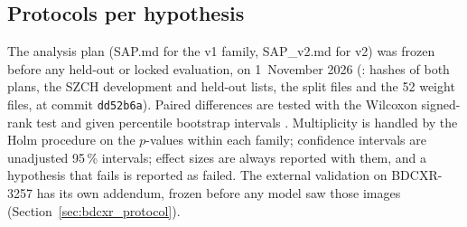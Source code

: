 \subsection{Protocols per hypothesis}
The analysis plan (SAP.md for the v1 family, SAP\_v2.md for v2) was frozen before any held-out or locked evaluation, on 1~November 2026
(: hashes of both plans, the SZCH development and held-out lists, the split files and the 52 weight files, at commit
\texttt{dd52b6a}). Paired differences are tested with the Wilcoxon signed-rank test \citep{wilcoxon1945individual} and given percentile bootstrap intervals
\citep{efron1993bootstrap}. Multiplicity is handled by the Holm procedure \citep{holm1979simple} on the $p$-values within each family; confidence intervals are unadjusted
95\,\% intervals; effect sizes are always reported with them, and a hypothesis that fails is reported as failed. The external validation on
BDCXR-3257 has its own addendum, frozen before any model saw those images (Section~\ref{sec:bdcxr_protocol}).
